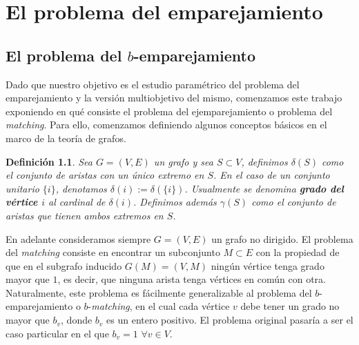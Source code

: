 \documentclass[twoside,a4paper,openright,12pt,tikz]{book}
\newtheorem{defi}{Definici\'on}[section]
\begin{document}


\newpage
\thispagestyle{empty}
\chapter{El problema del emparejamiento}
\section{El problema del $b$-emparejamiento}
Dado que nuestro objetivo es el estudio paramétrico del problema del emparejamiento y la versión multiobjetivo del mismo, comenzamos este trabajo exponiendo en qué consiste el problema del ejemparejamiento o problema del \textit{matching}. Para ello, comenzamos definiendo algunos conceptos básicos en el marco de la teoría de grafos.
\begin{defi}
Sea $G=(V,E)$ un grafo y sea $S \subset V$, definimos $\delta(S)$ como el conjunto de aristas con un único extremo en $S$. En el caso de un conjunto unitario $\{i\}$, denotamos $\delta(i):=\delta(\{i\})$. Usualmente se denomina \textbf{grado del vértice $i$} al cardinal de $\delta(i)$. Definimos además $\gamma(S)$ como el conjunto de aristas que tienen ambos extremos en $S$.
\end{defi}

En adelante consideramos siempre $G=(V,E)$ un grafo no dirigido. El problema del \textit{matching} consiste en encontrar un subconjunto $M\subset E$ con la propiedad de que en el subgrafo inducido $G(M)=(V,M)$ ningún vértice tenga grado mayor que $1$, es decir, que ninguna arista tenga vértices en común con otra. Naturalmente, este problema es fácilmente generalizable al problema del $b$-emparejamiento o $b$-\textit{matching}, en el cual cada vértice $v$ debe tener un grado no mayor que $b_v$, donde $b_v$ es un entero positivo. El problema original pasaría a ser el caso particular en el que $b_v = 1$ $\forall v \in V$.
\end{document}
